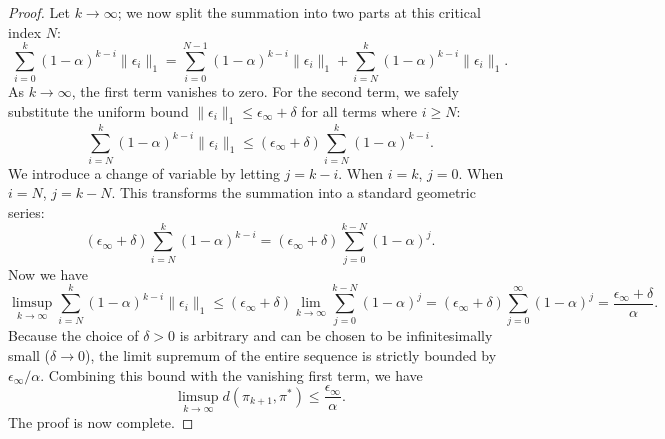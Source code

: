 \documentclass{article}
\theoremstyle{plain}
\theoremstyle{definition}
\theoremstyle{remark}
\begin{document}
\begin{proof}
	Let $k\to\infty$; we now split the summation into two parts at this critical index $N$:
	\begin{equation}
		\sum_{i=0}^{k}(1-\alpha)^{k-i}\lVert\epsilon_i\rVert_1=\sum_{i=0}^{N-1}(1-\alpha)^{k-i}\lVert\epsilon_i\rVert_1+\sum_{i=N}^{k}(1-\alpha)^{k-i}\lVert\epsilon_i\rVert_1.
	\end{equation}
	As $k \to \infty$, the first term vanishes to zero. For the second term, we safely substitute the uniform bound $\lVert\epsilon_i\rVert_1 \leq \epsilon_{\infty} + \delta$ for all terms where $i \geq N$:
	\begin{equation}
		\sum_{i=N}^{k}(1-\alpha)^{k-i}\lVert\epsilon_i\rVert_1\leq(\epsilon_{\infty}+\delta)\sum_{i=N}^{k}(1-\alpha)^{k-i}.
	\end{equation}
	We introduce a change of variable by letting $j = k - i$. When $i = k$, $j=0$. When $i=N$, $j = k - N$. This transforms the summation into a standard geometric series:
	\begin{equation}
		(\epsilon_{\infty}+\delta)\sum_{i=N}^{k}(1-\alpha)^{k-i}=(\epsilon_{\infty}+\delta)\sum_{j=0}^{k-N}(1-\alpha)^{j}.
	\end{equation}
	Now we have
	\begin{equation}
		\limsup_{k\to\infty}\sum_{i=N}^{k}(1-\alpha)^{k-i}\lVert\epsilon_i\rVert_1\leq(\epsilon_{\infty}+\delta)\lim_{k\to\infty}\sum_{j=0}^{k-N}(1-\alpha)^j=(\epsilon_{\infty}+\delta)\sum_{j=0}^{\infty}(1-\alpha)^j=\frac{\epsilon_{\infty}+\delta}{\alpha}.
	\end{equation}
	Because the choice of $\delta > 0$ is arbitrary and can be chosen to be infinitesimally small ($\delta \to 0$), the limit supremum of the entire sequence is strictly bounded by $\epsilon_{\infty}/\alpha$. Combining this bound with the vanishing first term, we have
	\begin{equation}
		\limsup_{k \rightarrow \infty}d(\pi_{k+1}, \pi^*)\leq\frac{\epsilon_{\infty}}{\alpha}.
	\end{equation}
	The proof is now complete.
\end{proof}
\end{document}
